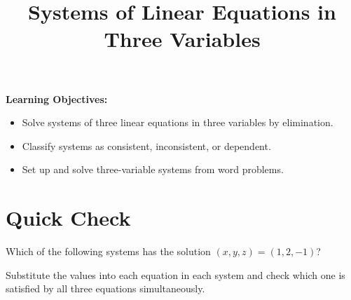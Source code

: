 \documentclass{ximera}
\title{Systems of Linear Equations in Three Variables}
\begin{document}
\begin{abstract}
\end{abstract}
\maketitle

\textbf{Learning Objectives:}
\begin{itemize}
  \item Solve systems of three linear equations in three variables by elimination.
  \item Classify systems as consistent, inconsistent, or dependent.
  \item Set up and solve three-variable systems from word problems.
\end{itemize}
\medskip

\section*{Quick Check}

\begin{problem}
Which of the following systems has the solution $(x,y,z) = (1,2,-1)$?
\begin{hint}
Substitute the values into each equation in each system and check which one is satisfied by all three equations simultaneously.
\end{hint}
\begin{multipleChoice}
\end{multipleChoice}
\end{problem}
\end{document}
